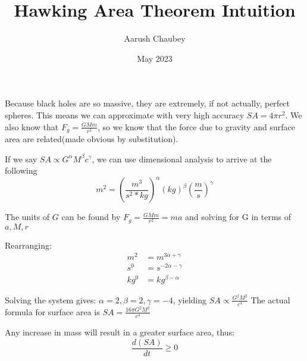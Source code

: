 \documentclass{article}
\title{Hawking Area Theorem Intuition}
\author{Aarush Chaubey}
\date{May 2023}
\begin{document}
\maketitle

Because black holes are so massive, they are extremely, if not actually, perfect spheres. This means we can approximate with very high accuracy $SA = 4\pi r^2$. We also know that $F_g=\frac{GMm}{r^2}$, so we know that the force due to gravity and surface area are related(made obvious by substitution).

\vspace{5mm}
If we say $SA \propto G^{\alpha}M^{\beta}c^{\gamma}$, we can use dimensional analysis to arrive at the following \[m^2=(\frac{m^3}{s^2*kg})^{\alpha}(kg)^{\beta}(\frac{m}{s})^{\gamma}\]


The units of $G$ can be found by $F_g=\frac{GMm}{r^2}=ma$ and solving for G in terms of $a,M,r$

Rearranging: 
\begin{align*}
    m^2&=m^{3\alpha+\gamma}\\
    s^0&=s^{-2\alpha-\gamma}\\
    kg^0&=kg^{\beta-\alpha}
\end{align*}

Solving the system gives: $\alpha=2,\beta=2,\gamma=-4$, yielding $\boxed{SA \propto \frac{G^2M^2}{c^4}}$ The actual formula for surface area is $\boxed{SA = \frac{16\pi G^2M^2}{c^4}}$

\vspace{5mm}
Any increase in mass will result in a greater surface area, thus:
\[\frac{d(SA)}{dt}\geq0\]
\end{document}
